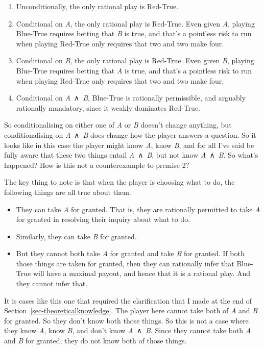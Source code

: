\documentclass[
  10pt,
  letterpaper,
  twoside]{scrbook}
\providecommand{\tightlist}{%
  \setlength{\itemsep}{0pt}\setlength{\parskip}{0pt}}\usepackage{longtable,booktabs,array}
\begin{document}
\begin{enumerate}
\def\labelenumi{\arabic{enumi}.}
\tightlist
\item
  Unconditionally, the only rational play is Red-True.
\item
  Conditional on \emph{A}, the only rational play is Red-True. Even
  given \emph{A}, playing Blue-True requires betting that \emph{B} is
  true, and that's a pointless risk to run when playing Red-True only
  requires that two and two make four.
\item
  Conditional on \emph{B}, the only rational play is Red-True. Even
  given \emph{B}, playing Blue-True requires betting that \emph{A} is
  true, and that's a pointless risk to run when playing Red-True only
  requires that two and two make four.
\item
  Conditional on \emph{A}~∧~\emph{B}, Blue-True is rationally
  permissible, and arguably rationally mandatory, since it weakly
  dominates Red-True.
\end{enumerate}

So conditionalising on either one of \emph{A} or \emph{B} doesn't change
anything, but conditionalising on \emph{A}~∧~\emph{B} does change how
the player answers a question. So it looks like in this case the player
might know \emph{A}, know \emph{B}, and for all I've said be fully aware
that these two things entail \emph{A}~∧~\emph{B}, but not know
\emph{A}~∧~\emph{B}. So what's happened? How is this not a
counterexample to premise 2?

The key thing to note is that when the player is choosing what to do,
the following things are all true about them.

\begin{itemize}
\tightlist
\item
  They can take \emph{A} for granted. That is, they are rationally
  permitted to take \emph{A} for granted in resolving their inquiry
  about what to do.
\item
  Similarly, they can take \emph{B} for granted.
\item
  But they cannot both take \emph{A} for granted and take \emph{B} for
  granted. If both those things are taken for granted, then they can
  rationally infer that Blue-True will have a maximal payout, and hence
  that it is a rational play. And they cannot infer that.
\end{itemize}

It is cases like this one that required the clarification that I made at
the end of Section~\ref{sec-theoreticalknowledge}. The player here
cannot take both of \emph{A} and \emph{B} for granted. So they don't
know both those things. So this is not a case where they know \emph{A},
know \emph{B}, and don't know \emph{A}~∧~\emph{B}. Since they cannot
take both \emph{A} and \emph{B} for granted, they do not know both of
those things.
\end{document}
